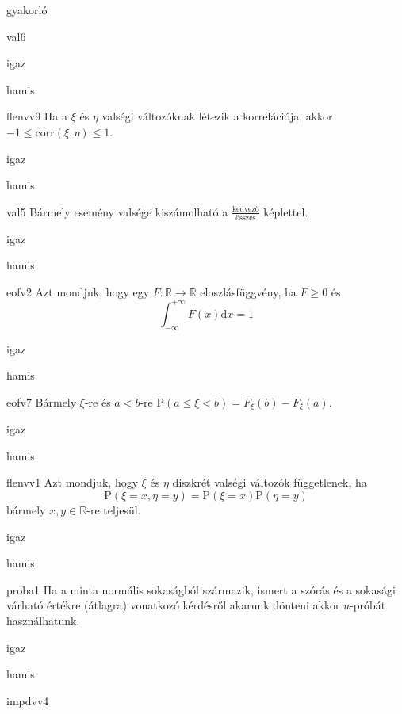 \documentclass[12pt]{article}
\begin{document}
\begin{quiz}{gyakorló}
\begin{multi}[feedback={Additívitás.}]{val6}
\item* igaz
\item hamis
\end{multi}
\begin{multi}[feedback={Tulajdonság,tétel.}]{flenvv9}
Ha a $\xi$ és $\eta$ valségi változóknak létezik a korrelációja, akkor $-1\le \mathrm{corr}(\xi,\eta)\le 1$.
\item* igaz
\item hamis
\end{multi}
\begin{multi}[feedback={Csak ha az elemi események egyforma valségűek.}]{val5}
Bármely esemény valsége kiszámolható a $\frac{\text{kedvező}}{\text{összes}}$ képlettel.
\item igaz
\item* hamis
\end{multi}
\begin{multi}[feedback={Ebből nem jön ki a pl. a monotonitás vagy a balról folytonosság.}]{eofv2}
Azt mondjuk, hogy egy $F:\mathbb{R}\to \mathbb{R}$ eloszlásfüggvény, ha $F\ge 0$ és 
$$
\int_{-\infty}^{+\infty}F(x)\mathrm{d } x=1
$$
\item igaz
\item* hamis
\end{multi}
\begin{multi}[feedback={$\{a\le\xi<b\}=\{\xi<b\}\setminus \{\xi<a\}$}]{eofv7}
Bármely $\xi$-re és $a<b$-re $\mathrm{P}(a\le \xi <b)=F_{\xi}(b)-F_{\xi}(a)$.
\item* igaz
\item hamis
\end{multi}
\begin{multi}[feedback={Def.}]{flenvv1}
Azt mondjuk, hogy $\xi$ és $\eta$ diszkrét valségi változók függetlenek, ha
$$
\mathrm{P}(\xi=x,\eta=y)=\mathrm{P}(\xi=x)\mathrm{P}(\eta=y)
$$
bármely $x,y\in \mathbb{R}$-re teljesül.
\item* igaz
\item hamis
\end{multi}
\begin{multi}[feedback={Ezek az $u$-próba használatának előzményei.}]{proba1}
Ha a minta normális sokaságból származik, ismert a szórás és a sokasági várható értékre (átlagra) vonatkozó kérdésről 
akarunk dönteni akkor $u$-próbát használhatunk.
\item* igaz
\item hamis
\end{multi}
\begin{multi}[feedback={$\xi=\xi_1+{...\:}+\xi_n$, ahol $\xi_k$ Bernoulli és $\mathrm{D}^2(\xi_k)=p(1-p)$+$\mathrm{D}^2$-additívitása(függetlenség esetén)}]{impdvv4}

\end{multi}
\end{quiz}
\end{document}
